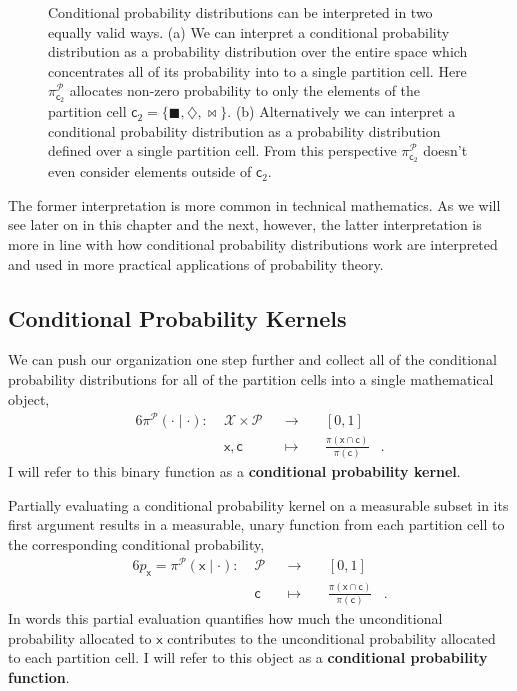 \documentclass[
  letterpaper,
  DIV=11,
  numbers=noendperiod]{scrartcl}
\begin{document}
\begin{figure}
\begin{minipage}{0.50\linewidth}
\end{minipage}%

\caption{\label{fig-conditional-interpretations}Conditional probability
distributions can be interpreted in two equally valid ways. (a) We can
interpret a conditional probability distribution as a probability
distribution over the entire space which concentrates all of its
probability into to a single partition cell. Here
\(\pi^{\mathcal{P}}_{ \mathsf{c}_{2} }\) allocates non-zero probability
to only the elements of the partition cell
\(\mathsf{c}_{2} = \{ \blacksquare, \diamondsuit, \bowtie \}\). (b)
Alternatively we can interpret a conditional probability distribution as
a probability distribution defined over a single partition cell. From
this perspective \(\pi^{\mathcal{P}}_{ \mathsf{c}_{2} }\) doesn't even
consider elements outside of \(\mathsf{c}_{2}\).}

\end{figure}%

The former interpretation is more common in technical mathematics. As we
will see later on in this chapter and the next, however, the latter
interpretation is more in line with how conditional probability
distributions work are interpreted and used in more practical
applications of probability theory.

\subsection{Conditional Probability
Kernels}\label{conditional-probability-kernels}

We can push our organization one step further and collect all of the
conditional probability distributions for all of the partition cells
into a single mathematical object, \begin{alignat*}{6}
\pi^{\mathcal{P}}( \cdot \mid \cdot )
:\; &\mathcal{X} \times \mathcal{P}& &\rightarrow& \; &[0, 1]&
\\
&\mathsf{x}, \mathsf{c}& &\mapsto&
&\frac{ \pi(\mathsf{x} \cap \mathsf{c}) }{ \pi (\mathsf{c}) }&.
\end{alignat*} I will refer to this binary function as a
\textbf{conditional probability kernel}.

Partially evaluating a conditional probability kernel on a measurable
subset in its first argument results in a measurable, unary function
from each partition cell to the corresponding conditional probability,
\begin{alignat*}{6}
p_{\mathsf{x}}
=
\pi^{\mathcal{P}}( \mathsf{x} \mid \cdot )
:\; &\mathcal{P}& &\rightarrow& \; &[0, 1]&
\\
&\mathsf{c}& &\mapsto&
&\frac{ \pi(\mathsf{x} \cap \mathsf{c}) }{ \pi (\mathsf{c}) }&.
\end{alignat*} In words this partial evaluation quantifies how much the
unconditional probability allocated to \(\mathsf{x}\) contributes to the
unconditional probability allocated to each partition cell. I will refer
to this object as a \textbf{conditional probability function}.
\end{document}
